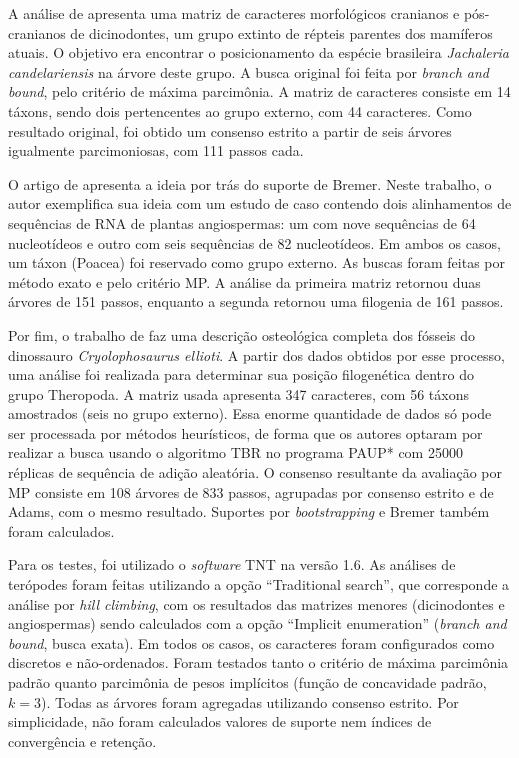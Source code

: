 \documentclass[12pt]{article}
\begin{document}
A análise de \cite{dicynodonts-cris} apresenta uma matriz de caracteres morfológicos cranianos e pós-cranianos de dicinodontes, um grupo extinto de répteis parentes dos mamíferos atuais. O objetivo era encontrar o posicionamento da espécie brasileira \emph{Jachaleria candelariensis} na árvore deste grupo. A busca original foi feita por \emph{branch and bound}, pelo critério de máxima parcimônia. A matriz de caracteres consiste em 14 táxons, sendo dois pertencentes ao grupo externo, com 44 caracteres. Como resultado original, foi obtido um consenso estrito a partir de seis árvores igualmente parcimoniosas, com 111 passos cada. 

O artigo de \cite{bremer-support} apresenta a ideia por trás do suporte de Bremer. Neste trabalho, o autor exemplifica sua ideia com um estudo de caso contendo dois alinhamentos de sequências de RNA de plantas angiospermas: um com nove sequências de 64 nucleotídeos e outro com seis sequências de 82 nucleotídeos. Em ambos os casos, um táxon (Poacea) foi reservado como grupo externo. As buscas foram feitas por método exato e pelo critério MP. A análise da primeira matriz retornou duas árvores de 151 passos, enquanto a segunda retornou uma filogenia de 161 passos.

Por fim, o trabalho de \cite{cryolophosaurus} faz uma descrição osteológica completa dos fósseis do dinossauro \emph{Cryolophosaurus ellioti}. A partir dos dados obtidos por esse processo, uma análise foi realizada para determinar sua posição filogenética dentro do grupo Theropoda. A matriz usada apresenta 347 caracteres, com 56 táxons amostrados (seis no grupo externo). Essa enorme quantidade de dados só pode ser processada por métodos heurísticos, de forma que os autores optaram por realizar a busca usando o algoritmo TBR no programa PAUP* com 25000 réplicas de sequência de adição aleatória. O consenso resultante da avaliação por MP consiste em 108 árvores de 833 passos, agrupadas por consenso estrito e de Adams, com o mesmo resultado. Suportes por \emph{bootstrapping} e Bremer também foram calculados.

Para os testes, foi utilizado o \emph{software} TNT na versão 1.6. As análises de terópodes foram feitas utilizando a opção ``Traditional search'', que corresponde a análise por \emph{hill climbing}, com os resultados das matrizes menores (dicinodontes e angiospermas) sendo calculados com a opção ``Implicit enumeration'' (\emph{branch and bound}, busca exata). Em todos os casos, os caracteres foram configurados como discretos e não-ordenados. Foram testados tanto o critério de máxima parcimônia padrão quanto parcimônia de pesos implícitos (função de concavidade padrão, $k = 3$). Todas as árvores foram agregadas utilizando consenso estrito.
Por simplicidade, não foram calculados valores de suporte nem índices de convergência e retenção.
\end{document}
